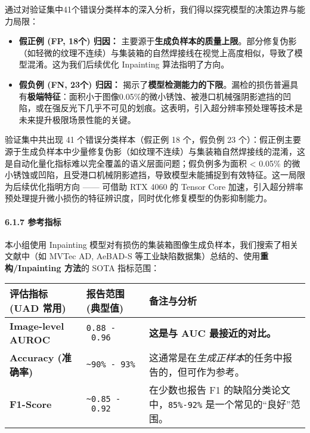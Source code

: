\documentclass[
]{article}
\begin{document}
通过对验证集中41个错误分类样本的深入分析，我们得以探究模型的决策边界与能力局限：

\begin{itemize}
\item
  \textbf{假正例 (FP, 18个) 归因：}
  主要源于\textbf{生成负样本的质量上限}。部分修复伪影（如轻微的纹理不连续）与集装箱的自然焊接线在视觉上高度相似，导致了模型混淆。这为我们后续优化
  Inpainting 算法指明了方向。
\item
  \textbf{假负例 (FN, 23个) 归因：}
  揭示了\textbf{模型检测能力的下限}。漏检的损伤普遍具有\textbf{极端特征}：面积小于图像0.05\%的微小锈蚀、被港口机械强阴影遮挡的凹陷，或在强反光下几乎不可见的划痕。这表明，引入超分辨率预处理等技术是未来提升极限场景性能的关键。
\end{itemize}

验证集中共出现 41 个错误分类样本（假正例 18 个，假负例 23
个）：假正例主要源于生成负样本中少量修复伪影（如纹理不连续）与集装箱自然焊接线的混淆，这是自动化量化指标难以完全覆盖的语义层面问题；假负例多为面积
\textless{} 0.05\%
的微小锈蚀或凹陷，且受港口机械阴影遮挡，导致模型未能捕捉到有效特征。这一局限为后续优化指明方向
------ 可借助 RTX 4060 的 Tensor Core
加速，引入超分辨率预处理提升微小损伤的特征辨识度，同时优化修复模型的伪影抑制能力。

\paragraph{6.1.7 参考指标}\label{617-ux53c2ux8003ux6307ux6807}

本小组使用 Inpainting
模型对有损伤的集装箱图像生成负样本，我们搜索了相关文献中（如 MVTec AD,
AeBAD-S 等工业缺陷数据集）总结的、使用\textbf{重构/Inpainting 方法}的
SOTA 指标范围：

\begin{longtable}[]{@{}lll@{}}
\toprule\noalign{}
\textbf{评估指标 (UAD 常用)} & \textbf{报告范围 (典型值)} &
\textbf{备注与分析} \\
\midrule\noalign{}
\endhead
\bottomrule\noalign{}
\endlastfoot
\textbf{Image-level AUROC} & \texttt{0.88\ -\ 0.96} & \textbf{这是与 AUC
最接近的对比。} \\
\textbf{Accuracy (准确率)} & \texttt{\textasciitilde{}90\%\ -\ 93\%} &
这通常是在\emph{生成正样本}的任务中报告的，但可作为参考。 \\
\textbf{F1-Score} & \texttt{\textasciitilde{}0.85\ -\ 0.92} &
在少数也报告 F1 的缺陷分类论文中，\texttt{85\%-92\%}
是一个常见的``良好''范围。 \\
\end{longtable}
\end{document}
